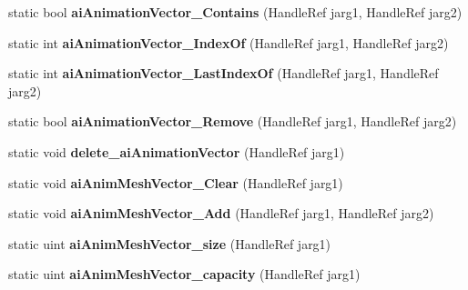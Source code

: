 \begin{DoxyCompactItemize}
\item 
\hypertarget{class_assimp_p_i_n_v_o_k_e_a4498d88211ba8a838d410ac38df8fdec}{static bool {\bfseries ai\+Animation\+Vector\+\_\+\+Contains} (Handle\+Ref jarg1, Handle\+Ref jarg2)}\label{class_assimp_p_i_n_v_o_k_e_a4498d88211ba8a838d410ac38df8fdec}

\item 
\hypertarget{class_assimp_p_i_n_v_o_k_e_a13fddb1422bf521e31e826b7e49b5411}{static int {\bfseries ai\+Animation\+Vector\+\_\+\+Index\+Of} (Handle\+Ref jarg1, Handle\+Ref jarg2)}\label{class_assimp_p_i_n_v_o_k_e_a13fddb1422bf521e31e826b7e49b5411}

\item 
\hypertarget{class_assimp_p_i_n_v_o_k_e_a19974921bc68973da831bca826233f62}{static int {\bfseries ai\+Animation\+Vector\+\_\+\+Last\+Index\+Of} (Handle\+Ref jarg1, Handle\+Ref jarg2)}\label{class_assimp_p_i_n_v_o_k_e_a19974921bc68973da831bca826233f62}

\item 
\hypertarget{class_assimp_p_i_n_v_o_k_e_af8c3be4f1de10da0eae5df5e65d2573f}{static bool {\bfseries ai\+Animation\+Vector\+\_\+\+Remove} (Handle\+Ref jarg1, Handle\+Ref jarg2)}\label{class_assimp_p_i_n_v_o_k_e_af8c3be4f1de10da0eae5df5e65d2573f}

\item 
\hypertarget{class_assimp_p_i_n_v_o_k_e_aa0a4b4b922f0aacfa24b1145198ce64b}{static void {\bfseries delete\+\_\+ai\+Animation\+Vector} (Handle\+Ref jarg1)}\label{class_assimp_p_i_n_v_o_k_e_aa0a4b4b922f0aacfa24b1145198ce64b}

\item 
\hypertarget{class_assimp_p_i_n_v_o_k_e_af3ab237d94b2fe6bfd0c52b96ad5b498}{static void {\bfseries ai\+Anim\+Mesh\+Vector\+\_\+\+Clear} (Handle\+Ref jarg1)}\label{class_assimp_p_i_n_v_o_k_e_af3ab237d94b2fe6bfd0c52b96ad5b498}

\item 
\hypertarget{class_assimp_p_i_n_v_o_k_e_a01a58c1869d3a650a6ca1adfc3011100}{static void {\bfseries ai\+Anim\+Mesh\+Vector\+\_\+\+Add} (Handle\+Ref jarg1, Handle\+Ref jarg2)}\label{class_assimp_p_i_n_v_o_k_e_a01a58c1869d3a650a6ca1adfc3011100}

\item 
\hypertarget{class_assimp_p_i_n_v_o_k_e_a759eacd3ea90cd32e8a066f0e32281c5}{static uint {\bfseries ai\+Anim\+Mesh\+Vector\+\_\+size} (Handle\+Ref jarg1)}\label{class_assimp_p_i_n_v_o_k_e_a759eacd3ea90cd32e8a066f0e32281c5}

\item 
\hypertarget{class_assimp_p_i_n_v_o_k_e_a7402f78b1907cf5f2bf205f31730cff3}{static uint {\bfseries ai\+Anim\+Mesh\+Vector\+\_\+capacity} (Handle\+Ref jarg1)}\label{class_assimp_p_i_n_v_o_k_e_a7402f78b1907cf5f2bf205f31730cff3}


\end{DoxyCompactItemize}

